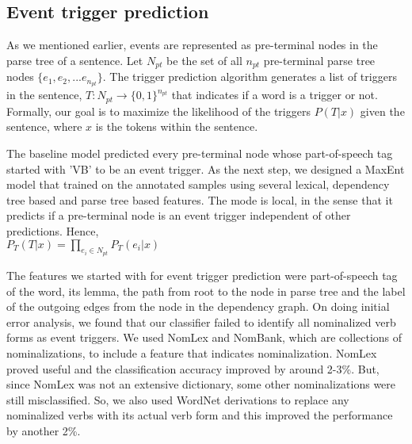 \subsection{Event trigger prediction}
As we mentioned earlier, events are represented as pre-terminal nodes in the parse tree of a sentence. Let $N_{pt}$ be the set of all $n_{pt}$ pre-terminal parse tree nodes $\{e_1, e_2, ... e_{n_{pt}}\}$. The trigger prediction algorithm generates a list of triggers in the sentence, $T : N_{pt} \rightarrow \{0,1\}^{n_{pt}}$ that indicates if a word is a trigger or not. Formally, our goal is to maximize the likelihood of the triggers $P(T | x)$ given the sentence, where $x$ is the tokens within the sentence.

The baseline model predicted every pre-terminal node whose part-of-speech tag started with 'VB' to be an event trigger. As the next step, we designed a MaxEnt model that trained on the annotated samples using several lexical, dependency tree based and parse tree based features. The mode is local, in the sense that it predicts if a pre-terminal node is an event trigger independent of other predictions. Hence, \\

$P_{T}(T | x) = \prod_{e_{i}\in N_{pt}} P_{T}(e_{i} | x) $

The features we started with for event trigger prediction were part-of-speech tag of the word, its lemma, the path from root to the node in parse tree and the label of the outgoing edges from the node in the dependency graph. On doing initial error analysis, we found that our classifier failed to identify all nominalized verb forms as event triggers. We used NomLex and NomBank, which are collections of nominalizations, to include a feature that indicates nominalization. NomLex proved useful and the classification accuracy improved by around 2-3\%. But, since NomLex was not an extensive dictionary, some other nominalizations were still misclassified. So, we also used WordNet derivations to replace any nominalized verbs with its actual verb form and this improved the performance by another 2\%.